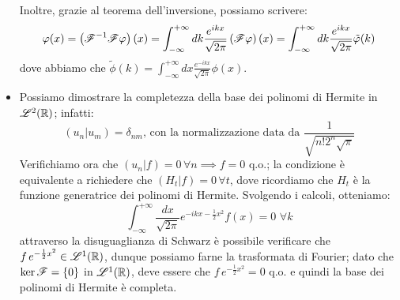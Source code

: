 \begin{itemize}
Inoltre, grazie al teorema dell'inversione, possiamo scrivere:
$$\varphi(x)=\left(\mathscr{F}^{-1} \mathscr{F} \varphi \right) (x) = \int_{-\infty} ^{+\infty} dk \frac{e^{ikx}}{\sqrt{2 \pi}} \left(\mathscr{F} \varphi \right) (x) =  \int_{-\infty} ^{+\infty} dk \frac{e^{ikx}}{\sqrt{2 \pi}} \tilde{\varphi} (k)$$
dove abbiamo che $\tilde{\phi} (k)=  \int_{-\infty} ^{+\infty} dx \frac{e^{-ikx}}{\sqrt{2 \pi}} \phi(x)$.
\item Possiamo dimostrare la completezza della base dei polinomi di Hermite in $\mathscr{L}^2 (\mathbb{R})$; infatti:
$$(u_n|u_m)= \delta_{nm} \text{, con la normalizzazione data da }\frac{1}{\sqrt{n! 2^n \sqrt{\pi}}}$$
Verifichiamo ora che $(u_n|f)=0 \, \forall n \implies f=0$ q.o.; la condizione è equivalente a richiedere che $(H_t|f)=0 \, \forall t$, dove ricordiamo che $H_t$ è la funzione generatrice dei polinomi di Hermite. Svolgendo i calcoli, otteniamo:
$$ \int_{-\infty} ^{+\infty} \frac{dx }{\sqrt{2 \pi}} e^{-ikx - \frac{1}{2} x^2} f(x)=0 \, \, \forall k$$
attraverso la disuguaglianza di Schwarz è possibile verificare che $f \, e^{-\frac{1}{2}x^2} \in \mathscr{L}^1 (\mathbb{R})$, dunque possiamo farne la trasformata di Fourier; dato che $\ker \mathscr{F} = \{0\}$ in $\mathscr{L}^1 (\mathbb{R})$, deve essere che $f \, e^{-\frac{1}{2}x^2} = 0$ q.o. e quindi la base dei polinomi di Hermite è completa.
\end{itemize}

